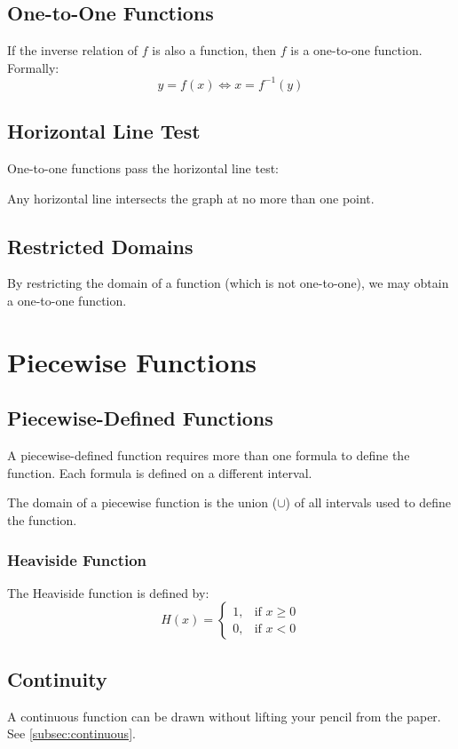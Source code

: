 		\subsection{One-to-One Functions}
			If the inverse relation of $f$ is also a function, then $f$ is a one-to-one function.
			\\
			Formally:
			\[y = f(x) \iff x = f^{-1}(y)\]
		\subsection{Horizontal Line Test}
			One-to-one functions pass the horizontal line test:

			Any horizontal line intersects the graph at no more than one point.
		\subsection{Restricted Domains}
			By restricting the domain of a function (which is not one-to-one), we may obtain a one-to-one function.
	\section{Piecewise Functions}
		\subsection{Piecewise-Defined Functions}
			A piecewise-defined function requires more than one formula to define the function. Each formula is defined on a different interval.

			The domain of a piecewise function is the union ($\cup$) of all intervals used to define the function.
			\subsubsection{Heaviside Function}
				The Heaviside function is defined by:
				\begin{equation*}
					H(x)=
					\begin{cases}
						1, &\text{if } x \geq 0\\
						0, &\text{if } x < 0
					\end{cases}
				\end{equation*}
		\subsection{Continuity}
			A continuous function can be drawn without lifting your pencil from the paper. See \ref{subsec:continuous}.
